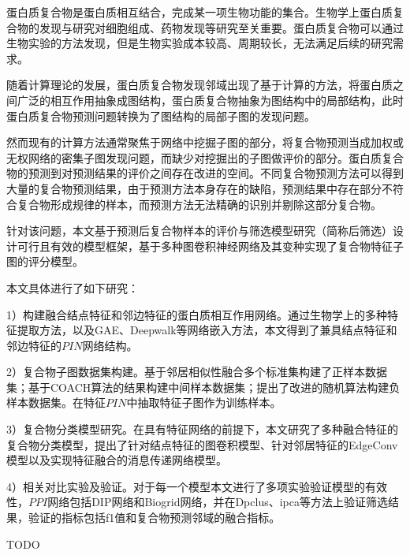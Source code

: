 \begin{cabstract}
  蛋白质复合物是蛋白质相互结合，完成某一项生物功能的集合。生物学上蛋白质复合物的发现与研究对细胞组成、药物发现等研究至关重要。蛋白质复合物可以通过生物实验的方法发现，但是生物实验成本较高、周期较长，无法满足后续的研究需求。
  
  随着计算理论的发展，蛋白质复合物发现邻域出现了基于计算的方法，将蛋白质之间广泛的相互作用抽象成图结构，蛋白质复合物抽象为图结构中的局部结构，此时蛋白质复合物预测问题转换为了图结构的局部子图的发现问题。

  然而现有的计算方法通常聚焦于网络中挖掘子图的部分，将复合物预测当成加权或无权网络的密集子图发现问题，而缺少对挖掘出的子图做评价的部分。蛋白质复合物的预测到对预测结果的评价之间存在改进的空间。不同复合物预测方法可以得到大量的复合物预测结果，由于预测方法本身存在的缺陷，预测结果中存在部分不符合复合物形成规律的样本，而预测方法无法精确的识别并剔除这部分复合物。
  
  针对该问题，本文基于预测后复合物样本的评价与筛选模型研究（简称后筛选）设计可行且有效的模型框架，基于多种图卷积神经网络及其变种实现了复合物特征子图的评分模型。

  本文具体进行了如下研究：

  1）构建融合结点特征和邻边特征的蛋白质相互作用网络。通过生物学上的多种特征提取方法，以及GAE、Deepwalk等网络嵌入方法，本文得到了兼具结点特征和邻边特征的$PIN$网络结构。

  2）复合物子图数据集构建。基于邻居相似性融合多个标准集构建了正样本数据集；基于COACH算法的结果构建中间样本数据集；提出了改进的随机算法构建负样本数据集。在特征$PIN$中抽取特征子图作为训练样本。

  3）复合物分类模型研究。在具有特征网络的前提下，本文研究了多种融合特征的复合物分类模型，提出了针对结点特征的图卷积模型、针对邻居特征的EdgeConv模型以及实现特征融合的消息传递网络模型。

  4）相关对比实验及验证。对于每一个模型本文进行了多项实验验证模型的有效性，$PPI$网络包括DIP网络和Biogrid网络，并在Dpclus、ipca等方法上验证筛选结果，验证的指标包括f1值和复合物预测邻域的融合指标。

\end{cabstract}


\begin{eabstract}
  TODO
\end{eabstract}

